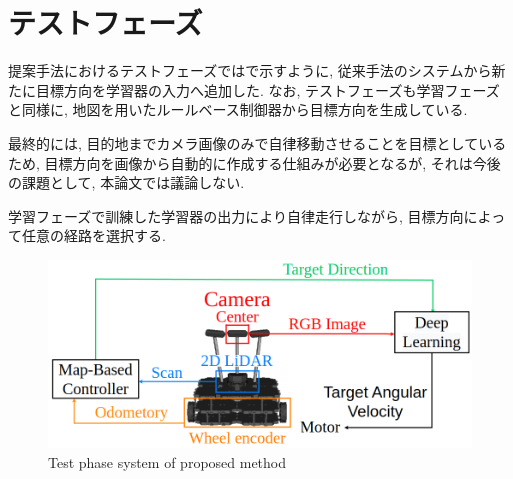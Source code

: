 
\section{テストフェーズ}
提案手法におけるテストフェーズではで示すように, 従来手法のシステムから新たに目標方向を学習器の入力へ追加した. なお, テストフェーズも学習フェーズと同様に, 地図を用いたルールベース制御器から目標方向を生成している. 
\par
最終的には, 目的地までカメラ画像のみで自律移動させることを目標としているため, 目標方向を画像から自動的に作成する仕組みが必要となるが, それは今後の課題として, 本論文では議論しない.


\par
学習フェーズで訓練した学習器の出力により自律走行しながら, 目標方向によって任意の経路を選択する.

\vspace{1cm}

\begin{figure}[hbtp]
  \centering
 \includegraphics[keepaspectratio, scale=0.38]
      {images/test_propose.png}
 \caption{Test phase system of proposed method}
 \label{Fig:suggest_test_phase}
\end{figure}

\newpage
